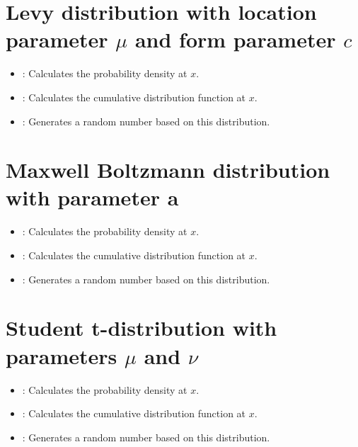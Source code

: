 \section{Levy distribution with location parameter \texorpdfstring{$\mu$}{mu} and form parameter \texorpdfstring{$c$}{c}}

\begin{itemize}

\item
{}:
Calculates the probability density at $x$.

\item
{}:
Calculates the cumulative distribution function at $x$.

\item
{}:
Generates a random number based on this distribution.

\end{itemize}



\section{Maxwell Boltzmann distribution with parameter a}

\begin{itemize}

\item
{}:
Calculates the probability density at $x$.

\item
{}:
Calculates the cumulative distribution function at $x$.

\item
{}:
Generates a random number based on this distribution.

\end{itemize}



\section{Student t-distribution with parameters \texorpdfstring{$\mu$}{mu} and \texorpdfstring{$\nu$}{nu}}

\begin{itemize}

\item
{}:
Calculates the probability density at $x$.

\item
{}:
Calculates the cumulative distribution function at $x$.

\item
{}:
Generates a random number based on this distribution.

\end{itemize}



